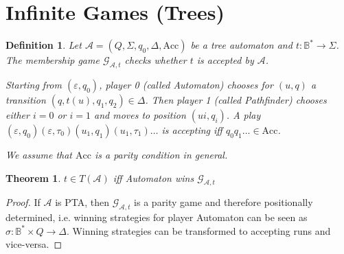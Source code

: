 \documentclass{article}
\newtheorem{theorem}{Theorem}
\newtheorem{definition}{Definition}
\begin{document}
\section{Infinite Games (Trees)}
\begin{definition}
	Let $\mathcal{A} = (Q, \Sigma, q_0, \Delta, \text{Acc})$ be a tree automaton and $t : \mathbb{B}^* \rightarrow \Sigma$. The membership game $\mathcal{G}_{\mathcal{A},t}$ checks whether $t$ is accepted by $\mathcal{A}$. 
	
	Starting from $(\varepsilon, q_0)$, player 0 (called Automaton) chooses for $(u, q)$ a transition $(q, t(u), q_1, q_2) \in \Delta$. Then player 1 (called Pathfinder) chooses either $i = 0$ or $i = 1$ and moves to position $(ui, q_i)$. A play $(\varepsilon, q_0) (\varepsilon, \tau_0) (u_1, q_1) (u_1, \tau_1) \dots$ is accepting iff $q_0 q_1 \dots \in \text{Acc}$.
	
	We assume that $\text{Acc}$ is a parity condition in general.
\end{definition}

\begin{theorem}
	$t \in T(\mathcal{A})$ iff Automaton wins $\mathcal{G}_{\mathcal{A},t}$
\end{theorem}
\begin{proof}
	If $\mathcal{A}$ is PTA, then $\mathcal{G}_{\mathcal{A},t}$ is a parity game and therefore positionally determined, i.e. winning strategies for player Automaton can be seen as $\sigma : \mathbb{B}^* \times Q \rightarrow \Delta$. Winning strategies can be transformed to accepting runs and vice-versa. 
\end{proof}
\end{document}
